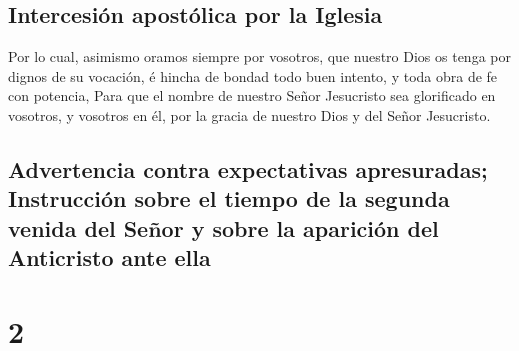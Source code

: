 \hypertarget{intercesiuxf3n-apostuxf3lica-por-la-iglesia}{%
\subsection{Intercesión apostólica por la
Iglesia}\label{intercesiuxf3n-apostuxf3lica-por-la-iglesia}}

 Por lo cual, asimismo oramos siempre por vosotros, que
nuestro Dios os tenga por dignos de su vocación, é hincha de bondad todo
buen intento, y toda obra de fe con potencia,  Para que
el nombre de nuestro Señor Jesucristo sea glorificado en vosotros, y
vosotros en él, por la gracia de nuestro Dios y del Señor Jesucristo.

\hypertarget{advertencia-contra-expectativas-apresuradas-instrucciuxf3n-sobre-el-tiempo-de-la-segunda-venida-del-seuxf1or-y-sobre-la-apariciuxf3n-del-anticristo-ante-ella}{%
\subsection{Advertencia contra expectativas apresuradas; Instrucción
sobre el tiempo de la segunda venida del Señor y sobre la aparición del
Anticristo ante
ella}\label{advertencia-contra-expectativas-apresuradas-instrucciuxf3n-sobre-el-tiempo-de-la-segunda-venida-del-seuxf1or-y-sobre-la-apariciuxf3n-del-anticristo-ante-ella}}

\hypertarget{section-1}{%
\section{2}\label{section-1}}

